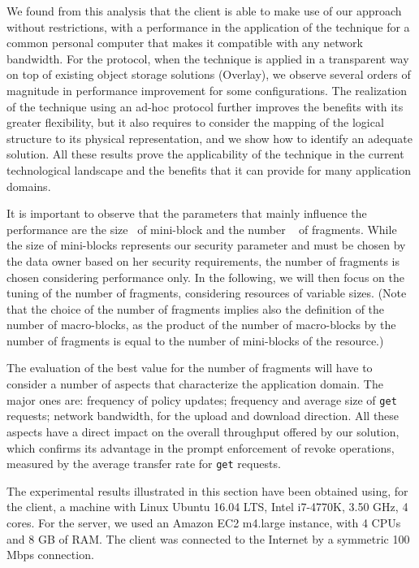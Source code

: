 We found from this analysis that the client is able to make use of our approach without restrictions, with a performance in the application of the technique for a common personal computer that makes it compatible with any network bandwidth. For the protocol, when the technique is applied in a transparent way on top of existing object storage solutions (Overlay), we observe several orders of magnitude in performance improvement for some configurations. The realization of the technique using an ad-hoc protocol further improves the benefits with its greater flexibility, but it also requires to consider the mapping of the logical structure to its physical representation, and we show how to identify an adequate solution. All these results prove the applicability of the technique in the current technological landscape and the benefits that it can provide for many application domains.

It is important to observe that the parameters that mainly influence the performance are the size \msize\ of mini-block and the number \fnum\ \! of fragments. While the size of mini-blocks represents our security parameter and must be chosen by the data owner based on her security requirements, the number of fragments is chosen considering performance only. In the following, we will then focus on the tuning of the number of fragments, considering resources of variable sizes. (Note that the choice of the number of fragments implies also the definition of the number of macro-blocks, as the product of the number of macro-blocks by the number of fragments is equal to the number of mini-blocks of the resource.)

The evaluation of the best value for the number of fragments will have to consider a number of aspects that characterize the application domain. The major ones are: frequency of policy updates; frequency and average size of {\tt get} requests; network bandwidth, for the upload and download direction. All these aspects have a direct impact on the overall throughput offered by our solution, which confirms its advantage in the prompt enforcement of revoke operations, measured by the average transfer rate for {\tt get} requests. 

The experimental results illustrated in this section have been obtained using, for the client, a machine with Linux Ubuntu 16.04 LTS, Intel i7-4770K, 3.50 GHz, 4 cores. For the server, we used an Amazon EC2 m4.large instance, with 4 CPUs and 8 GB of RAM. The client was connected to the Internet by a symmetric 100 Mbps connection.

